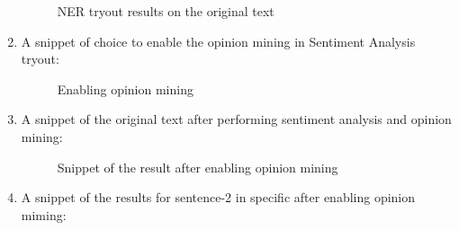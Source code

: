 \begin{enumerate}
\begin {figure}[h!h]
            \caption{\acs{NER} tryout results on the original text}
            \label{nerogtext}
        \end {figure}
    \item A snippet of choice to enable the opinion mining in Sentiment Analysis tryout:
        \begin {figure}[h!h]
            \centering
            \caption{Enabling opinion mining}
            \label{enableopinion}
        \end {figure}
    \item A snippet of the original text after performing sentiment analysis and opinion mining:
        \begin {figure}[h!h]
            \centering
            \caption{Snippet of the result after enabling opinion mining}
            \label{opinionres}
        \end {figure}
    \item A snippet of the results for sentence-2 in specific after enabling opinion miming:
        \begin {figure}[h!h]
            \centering

\end{figure}
\end{enumerate}

